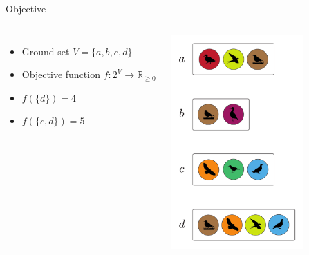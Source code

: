 \documentclass[xetex,10pt,mathserif]{beamer}
\begin{document}
\begin{frame}{Objective}
\begin{columns}[c]
\begin{itemize}
\item Ground set $V = \{a, b, c, d\}$
\vspace{2em}
\item Objective function $f : 2^V \to \mathbb{R}_{\geq 0}$
\vspace{2em}
\item $f(\{d\}) = 4$
\vspace{2em}
\item $f(\{c, d\}) = 5$
\end{itemize}
\centering
\includegraphics[width=2in]{figures/sets.pdf}
\end{columns}
\end{frame}
\end{document}
